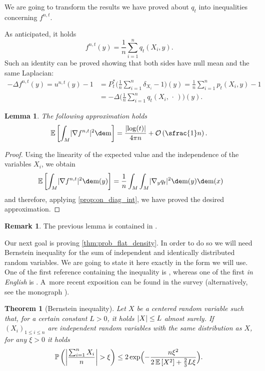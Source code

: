 \documentclass[10pt]{amsart}
\newcounter{results}[section]
\theoremstyle{plain}
\newtheorem{theorem}[theorem]{Theorem}
\newtheorem{lemma}[lemma]{Lemma}
\theoremstyle{definition}
\newtheorem{remark}[remark]{Remark}
\numberwithin{equation}{section}
\newcommand{\E}[1]{\ensuremath{\operatorname{\mathbb{E}}\left[#1\right]}}
\newcommand{\emptyparam}{\ensuremath{\,\cdot\,}}
\newcommand{\lapl}{\ensuremath{\Delta}}
\newcommand{\bigo}{\ensuremath{\mathcal{O}}}
\renewcommand{\P}[1]{\ensuremath{\operatorname{\mathbb{P}}\left(#1\right)}}
\newcommand{\fullstop}{\ensuremath{\text{. }}}
\newcommand{\m}{\ensuremath{\mathrm m}}
\DeclarePairedDelimiter\abs{\lvert}{\rvert}
\begin{document}
We are going to transform the results we have proved about $q_t$ into inequalities concerning $f^{n,t}$.

As anticipated, it holds
\begin{equation}\label{eq:f_as_average}
f^{n,t}(y) = \frac1n\sum_{i=1}^n q_t(X_i, y)\fullstop
\end{equation}
Such an identity can be proved showing that both sides have null mean and the same Laplacian:
\begin{align*}
-\lapl f^{n,t}(y) = u^{n,t}(y)-1 &= P^*_t\biggl(\frac1n \sum_{i=1}^n \delta_{X_i}-1\biggr)(y)
= \frac1n\sum_{i=1}^n p_t(X_i,y)-1 \\
&= -\lapl\biggl(\frac1n\sum_{i=1}^n q_t(X_i, \emptyparam)\biggr)(y) \fullstop
\end{align*}

\begin{lemma}\label{lem:int_nabla_f}
The following approximation holds
\begin{equation*}
\E{\int_M\abs{\nabla f^{n,t}}^2\de\m}
= \frac{\abs{\log(t)}}{4\pi n} + \bigo\left(\sfrac{1}n\right) \fullstop
\end{equation*}
\end{lemma}
\begin{proof}
Using the linearity of the expected value and the independence of the variables $X_i$, we obtain
\begin{equation*}
\E{\int_M\abs{\nabla f^{n,t}}^2\de\m(y)} =\frac1n\int_M\int_M\abs{\nabla_y q_t}^2\de\m(y)\de\m(x)
\end{equation*}
and therefore, applying \cref{prop:on_diag_int}, we have proved the desired approximation.
\end{proof}
\begin{remark}
The previous lemma is contained in \cite[Lem.\,3.16]{Ambrosio-Stra-Trevisan2018}.
\end{remark}

Our next goal is proving \cref{thm:prob_flat_density}.
In order to do so we will need Bernstein inequality for the sum of independent and identically
distributed random variables.
We are going to state it here exactly in the form we will use.
One of the first reference containing the inequality is \cite{Bernstein46}, whereas one of the
first \emph{in English} is \cite{Hoeffding63}.
A~more recent exposition can be found in the survey \cite[Th.\,3.6,3.7]{ChungLu2006} (alternatively, see the monograph \cite{boucheron2003}).

\begin{theorem}[Bernstein inequality]\label{thm:bernstein}
Let $X$ be a centered random variable such that, for a certain constant $L>0$,
it holds $\abs{X}\leq L$ almost surely.
If $(X_i)_{1\le i\le n}$ are independent random variables with the same distribution as $X$,
for any $\xi>0$ it holds
\begin{equation*}
\P{\abs*{\frac{\sum_{i=1}^n X_i}{n}}>\xi}
\le 2\exp\Bigl(-\frac{n\xi^2}{2\E{X^2}+\frac23L\xi}\Bigr) \fullstop
\end{equation*}
\end{theorem}
\end{document}
